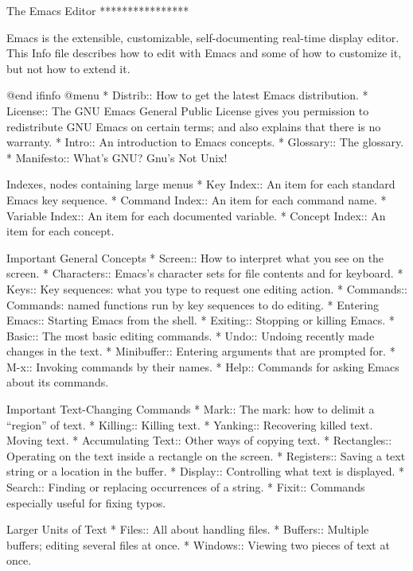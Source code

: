 The Emacs Editor
****************

Emacs is the extensible, customizable, self-documenting real-time
display editor.  This Info file describes how to edit with Emacs
and some of how to customize it, but not how to extend it.

@end ifinfo
@menu
* Distrib::     How to get the latest Emacs distribution.
* License::     The GNU Emacs General Public License gives you permission
		to redistribute GNU Emacs on certain terms; and also
		explains that there is no warranty.
* Intro::       An introduction to Emacs concepts.
* Glossary::    The glossary.
* Manifesto::   What's GNU?  Gnu's Not Unix!

Indexes, nodes containing large menus
* Key Index::      An item for each standard Emacs key sequence.
* Command Index::  An item for each command name.
* Variable Index:: An item for each documented variable.
* Concept Index::  An item for each concept.

Important General Concepts
* Screen::      How to interpret what you see on the screen.
* Characters::  Emacs's character sets for file contents and for keyboard.
* Keys::        Key sequences: what you type to request one editing action.
* Commands::    Commands: named functions run by key sequences to do editing.
* Entering Emacs::  Starting Emacs from the shell.
* Exiting::     Stopping or killing Emacs.
* Basic::       The most basic editing commands.
* Undo::        Undoing recently made changes in the text.
* Minibuffer::  Entering arguments that are prompted for.
* M-x::         Invoking commands by their names.
* Help::        Commands for asking Emacs about its commands.

Important Text-Changing Commands
* Mark::        The mark: how to delimit a ``region'' of text.
* Killing::     Killing text.
* Yanking::     Recovering killed text.  Moving text.
* Accumulating Text::
                Other ways of copying text.
* Rectangles::  Operating on the text inside a rectangle on the screen.
* Registers::   Saving a text string or a location in the buffer.
* Display::     Controlling what text is displayed.
* Search::      Finding or replacing occurrences of a string.
* Fixit::       Commands especially useful for fixing typos.

Larger Units of Text
* Files::       All about handling files.
* Buffers::     Multiple buffers; editing several files at once.
* Windows::     Viewing two pieces of text at once.

